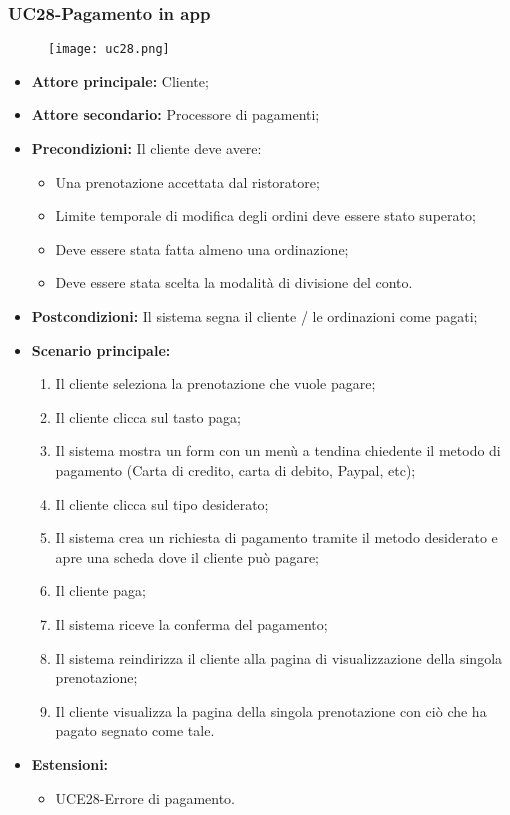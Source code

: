 \subsubsection{UC28-Pagamento in app}
\begin{figure}[h] \texttt{[image: uc28.png]} \end{figure}
\begin{itemize}
\item \textbf{Attore principale:} Cliente;
\item \textbf{Attore secondario:} Processore di pagamenti;
\item \textbf{Precondizioni:} Il cliente deve avere:
  \begin{itemize}
    \item Una prenotazione accettata dal ristoratore;
    \item Limite temporale di modifica degli ordini deve essere stato superato;
    \item Deve essere stata fatta almeno una ordinazione;
    \item Deve essere stata scelta la modalità di divisione del conto.
  \end{itemize}
\item \textbf{Postcondizioni:} Il sistema segna il cliente / le ordinazioni come pagati;
\item \textbf{Scenario principale:}
\begin{enumerate}
    \item Il cliente seleziona la prenotazione che vuole pagare;
    \item Il cliente clicca sul tasto paga;
    \item Il sistema mostra un form con un menù a tendina chiedente il metodo di pagamento (Carta di credito, carta di debito, Paypal, etc);
    \item Il cliente clicca sul tipo desiderato;
    \item Il sistema crea un richiesta di pagamento tramite il metodo desiderato e apre una scheda dove il cliente può pagare;
    \item Il cliente paga;
    \item Il sistema riceve la conferma del pagamento;
    \item Il sistema reindirizza il cliente alla pagina di visualizzazione della singola prenotazione;
    \item Il cliente visualizza la pagina della singola prenotazione con ciò che ha pagato segnato come tale.
\end{enumerate}
    \item \textbf{Estensioni:}
        \begin{itemize}
                \item UCE28-Errore di pagamento.
        \end{itemize}
\end{itemize}

